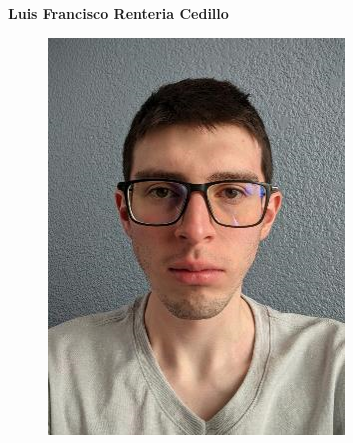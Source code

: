 \documentclass[12pt,twoside]{article}
\begin{document}
    \textbf{\large Luis Francisco Renteria Cedillo}
    \begin{figure}[H]
        \centering
        \includegraphics[angle=0, scale=0.5]{imagenes/foto1.png}
    \end{figure}
    
\end{document}

